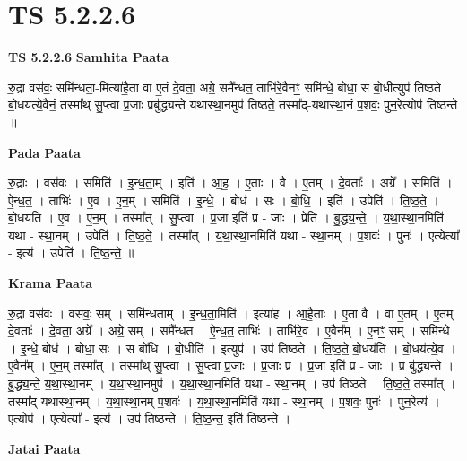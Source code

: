 \documentclass[17pt]{extarticle}
\begin{document}
\section{ TS 5.2.2.6 }

\textbf{TS 5.2.2.6 } \newline
\textbf{Samhita Paata} \newline

रु॒द्रा वस॑वः॒ समि॑न्धता॒-मित्या॑है॒ता वा ए॒तं दे॒वता॒ अग्रे॒ समै᳚न्धत॒ ताभि॑रे॒वैनꣳ॒॒ समि॑न्धे॒ बोधा॒ स बो॒धीत्युप॑ तिष्ठते बो॒धय॑त्ये॒वैनं॒ तस्मा᳚थ् सु॒प्त्वा प्र॒जाः प्रबु॑द्ध्यन्ते यथास्था॒नमुप॑ तिष्ठते॒ तस्मा᳚द्-यथास्था॒नं प॒शवः॒ पुन॒रेत्योप॑ तिष्ठन्ते ॥ \newline

\textbf{Pada Paata} \newline

रु॒द्राः । वस॑वः । समिति॑ । इ॒न्ध॒ता॒म् । इति॑ । आ॒ह॒ । ए॒ताः । वै । ए॒तम् । दे॒वताः᳚ । अग्रे᳚ । समिति॑ । ऐ॒न्ध॒त॒ । ताभिः॑ । ए॒व । ए॒न॒म् । समिति॑ । इ॒न्धे॒ । बोध॑ । सः । बो॒धि॒ । इति॑ । उपेति॑ । ति॒ष्ठ॒ते॒ । बो॒धय॑ति । ए॒व । ए॒न॒म् । तस्मा᳚त् । सु॒प्त्वा । प्र॒जा इति॑ प्र - जाः । प्रेति॑ । बु॒द्ध्य॒न्ते॒ । य॒था॒स्था॒नमिति॑ यथा - स्था॒नम् । उपेति॑ । ति॒ष्ठ॒ते॒ । तस्मा᳚त् । य॒था॒स्था॒नमिति॑ यथा - स्था॒नम् । प॒शवः॑ । पुनः॑ । एत्येत्या᳚ - इत्य॑ । उपेति॑ । ति॒ष्ठ॒न्ते॒ ॥  \newline


\textbf{Krama Paata} \newline

रु॒द्रा वस॑वः । वस॑वः॒ सम् । समि॑न्धताम् । इ॒न्ध॒ता॒मिति॑ । इत्या॑ह । आ॒है॒ताः । ए॒ता वै । वा ए॒तम् । ए॒तम् दे॒वताः᳚ । दे॒वता॒ अग्रे᳚ । अग्रे॒ सम् । समै᳚न्धत । ऐ॒न्ध॒त॒ ताभिः॑ । ताभि॑रे॒व । ए॒वैन᳚म् । ए॒नꣳ॒॒ सम् । समि॑न्धे । इ॒न्धे॒ बोध॑ । बोधा॒ सः । स बो॑धि । बो॒धीति॑ । इत्युप॑ । उप॑ तिष्ठते । ति॒ष्ठ॒ते॒ बो॒धय॑ति । बो॒धय॑त्ये॒व । ए॒वैन᳚म् । ए॒न॒म् तस्मा᳚त् । तस्मा᳚थ् सु॒प्त्वा । सु॒प्त्वा प्र॒जाः । प्र॒जाः प्र । प्र॒जा इति॑ प्र - जाः । प्र बु॑द्ध्यन्ते । बु॒द्ध्य॒न्ते॒ य॒था॒स्था॒नम् । य॒था॒स्था॒नमुप॑ । य॒था॒स्था॒नमिति॑ यथा - स्था॒नम् । उप॑ तिष्ठते । ति॒ष्ठ॒ते॒ तस्मा᳚त् । तस्मा᳚द् यथास्था॒नम् । य॒था॒स्था॒नम् प॒शवः॑ । य॒था॒स्था॒नमिति॑ यथा - स्था॒नम् । प॒शवः॒ पुनः॑ । पुन॒रेत्य॑ । एत्योप॑ । एत्येत्या᳚ - इत्य॑ । उप॑ तिष्ठन्ते । ति॒ष्ठ॒न्त॒ इति॑ तिष्ठन्ते । \newline

\textbf{Jatai Paata} \newline
\end{document}
